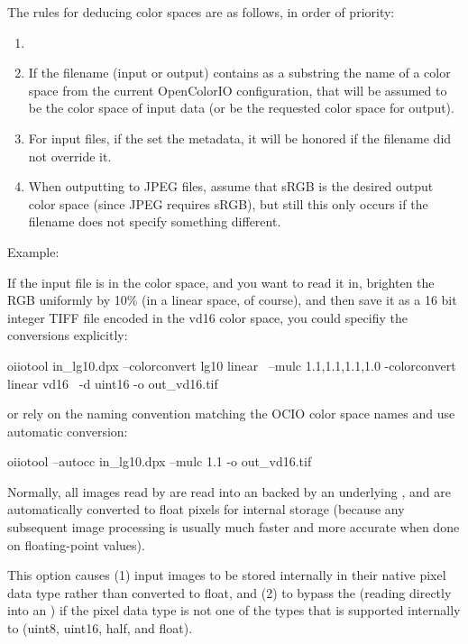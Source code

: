 The rules for deducing color spaces are as follows, in order of priority:

\begin{enumerate}
\item[]
\item If the filename (input or output) contains as a substring the name
  of a color space from the current OpenColorIO configuration, that will
  be assumed to be the color space of input data (or be the requested
  color space for output).
\item For input files, if the \ImageInput set the 
  metadata, it will be honored if the filename did not override it.
\item When outputting to JPEG files, assume that sRGB is the desired
  output color space (since JPEG requires sRGB), but still this only
  occurs if the filename does not specify something different.
\end{enumerate}

\noindent Example:

If the input file  is in the  color space,
and you want to read it in, brighten the RGB uniformly by 10\% (in a linear
space, of course), and then save it as a 16 bit integer TIFF file encoded
in the {\cf vd16} color space, you could specifiy the conversions
explicitly:

\begin{code}
  oiiotool in_lg10.dpx --colorconvert lg10 linear \
                       --mulc 1.1,1.1,1.1,1.0 -colorconvert linear vd16 \
                       -d uint16 -o out_vd16.tif
\end{code}

\noindent or rely on the naming convention matching the OCIO color space
names and use automatic conversion:

\begin{code}
  oiiotool --autocc in_lg10.dpx --mulc 1.1 -o out_vd16.tif
\end{code}

\apiend

Normally, all images read by \oiiotool are read into an \ImageBuf backed by
an underlying \ImageCache, and are automatically converted to {\cf float}
pixels for internal storage (because any subsequent image processing is
usually much faster and more accurate when done on floating-point values).

This option causes (1) input images to be stored internally in their native
pixel data type rather than converted to float, and (2) to bypass the
\ImageCache (reading directly into an \ImageBuf) if the pixel data type is
not one of the types that is supported internally to \ImageCache ({\cf uint8},
{\cf uint16}, {\cf half}, and {\cf float}).


